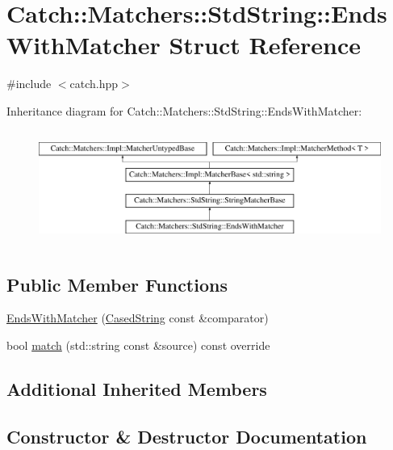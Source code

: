 \hypertarget{struct_catch_1_1_matchers_1_1_std_string_1_1_ends_with_matcher}{}\section{Catch\+::Matchers\+::Std\+String\+::Ends\+With\+Matcher Struct Reference}
\label{struct_catch_1_1_matchers_1_1_std_string_1_1_ends_with_matcher}


{\ttfamily \#include $<$catch.\+hpp$>$}

Inheritance diagram for Catch\+::Matchers\+::Std\+String\+::Ends\+With\+Matcher\+:\begin{figure}[H]
\begin{center}
\leavevmode
\includegraphics[height=3.758389cm]{struct_catch_1_1_matchers_1_1_std_string_1_1_ends_with_matcher}
\end{center}
\end{figure}
\subsection*{Public Member Functions}
\begin{DoxyCompactItemize}
\item 
\mbox{\hyperlink{struct_catch_1_1_matchers_1_1_std_string_1_1_ends_with_matcher_aa5ec700b4629562f74f362080accfd7b}{Ends\+With\+Matcher}} (\mbox{\hyperlink{struct_catch_1_1_matchers_1_1_std_string_1_1_cased_string}{Cased\+String}} const \&comparator)
\item 
bool \mbox{\hyperlink{struct_catch_1_1_matchers_1_1_std_string_1_1_ends_with_matcher_aca2741fa57374a2a98d2a84ac3e13a6d}{match}} (std\+::string const \&source) const override
\end{DoxyCompactItemize}
\subsection*{Additional Inherited Members}


\subsection{Constructor \& Destructor Documentation}
\mbox{\label{struct_catch_1_1_matchers_1_1_std_string_1_1_ends_with_matcher_aa5ec700b4629562f74f362080accfd7b}} 
